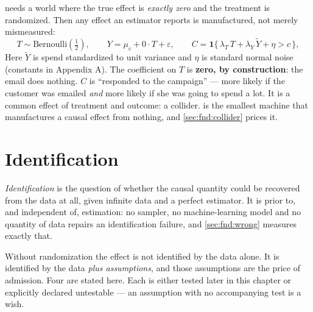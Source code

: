  needs a world where the true effect is \emph{exactly zero} and the
treatment is randomized. Then any effect an estimator reports is manufactured, not merely
mismeasured:
%
\begin{equation}
  T \sim \text{Bernoulli}(\tfrac12), \qquad
  Y = \mu_c + 0 \cdot T + \varepsilon, \qquad
  C = \mathbf 1\big\{\,\lambda_T\,T + \lambda_Y\,\tilde Y + \eta > c\,\big\},
  \label{eq:fnd:collider}
\end{equation}
%
Here $\tilde Y$ is spend standardized to unit variance and $\eta$ is standard normal noise
(constants in Appendix A). The coefficient on $T$ is \textbf{zero, by construction}: the email
does nothing. $C$ is ``responded to the campaign'' --- more likely if the customer was emailed
\emph{and} more likely if she was going to spend a lot. It is a common effect of treatment and
outcome: a collider.  is the smallest machine that manufactures a causal
effect from nothing, and \cref{sec:fnd:collider} prices it.

\section{Identification}
\label{sec:fnd:ident}

\emph{Identification} is the question of whether the causal quantity could be recovered from the
data at all, given infinite data and a perfect estimator. It is prior to, and independent of,
estimation: no sampler, no machine-learning model and no quantity of data repairs an
identification failure, and \cref{sec:fnd:wrong} measures exactly that.

Without randomization the effect is not identified by the data alone. It is identified by the
data \emph{plus assumptions}, and those assumptions are the price of admission. Four are stated
here. Each is either tested later in this chapter or explicitly declared untestable --- an
assumption with no accompanying test is a wish.

